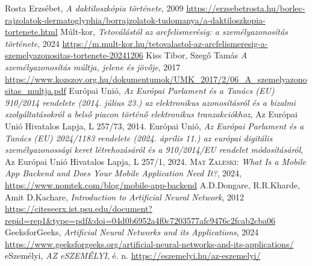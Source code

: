 \documentclass[
]{thesis-ekf}
\theoremstyle{definition}
\theoremstyle{remark}
\begin{document}
\begin{thebibliography}{9}
	 Rosta Erzsébet, \textit{A daktiloszkópia története}, 2009 \url{https://erzsebetrosta.hu/borlec-rajzolatok-dermatoglyphia/borrajzolatok-tudomanya/a-daktiloszkopia-tortenete.html}
	 Múlt-kor, \textit{Tetoválástól az arcfelismerésig: a személyazonosítás története}, 2024 \url{https://m.mult-kor.hu/tetovalastol-az-arcfelismeresig-a-szemelyazonositas-tortenete-20241206}
	 Kiss Tibor, Szegő Tamás \textit{A személyazonosítás múltja, jelene és jövője}, 2017 \url{https://www.kozszov.org.hu/dokumentumok/UMK_2017/2/06_A_szemelyazonositas_multja.pdf}
	 Európai Unió, \textit{Az Európai Parlament és a Tanács (EU) 910/2014 rendelete (2014. július 23.) az elektronikus azonosításról és a bizalmi szolgáltatásokról a belső piacon történő elektronikus tranzakciókhoz}, Az Európai Unió Hivatalos Lapja, L 257/73, 2014.
	 Európai Unió, \textit{Az Európai Parlament és a Tanács (EU) 2024/1183 rendelete (2024. április 11.) az európai digitális személyazonossági keret létrehozásáról és a 910/2014/EU rendelet módosításáról}, Az Európai Unió Hivatalos Lapja, L 257/1, 2024.
	 \textsc{Mat Zaleski:} \textit{What Is a Mobile App Backend and Does Your Mobile Application Need It?}, 2024, \url{https://www.nomtek.com/blog/mobile-app-backend}
	 A.D.Dongare, R.R.Kharde, Amit D.Kachare, \textit{Introduction to Artificial Neural Network}, 2012 \url{https://citeseerx.ist.psu.edu/document?repid=rep1&type=pdf&doi=04d0b6952a4f0c7203577afc9476c2fcab2cba06}
	 GeeksforGeeks, \textit{Artificial Neural Networks and its Applications}, 2024 \url{https://www.geeksforgeeks.org/artificial-neural-networks-and-its-applications/}
	 eSzemélyi, \textit{AZ eSZEMÉLYI}, é. n. \url{https://eszemelyi.hu/az-eszemelyi/}
\end{thebibliography}
	
\end{document}
